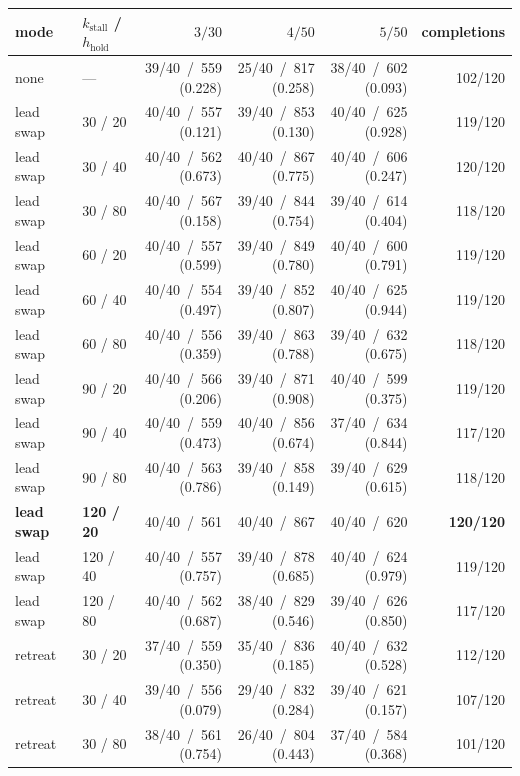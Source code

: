 \begin{tabular}{llrrrr}
\toprule
mode & $k_{\mathrm{stall}}$ / $h_{\mathrm{hold}}$ & $3/30$ & $4/50$ & $5/50$ & completions \\
\midrule
none & --- & 39/40 \,/\, 559 (0.228) & 25/40 \,/\, 817 (0.258) & 38/40 \,/\, 602 (0.093) & 102/120 \\
lead swap & 30 / 20 & 40/40 \,/\, 557 (0.121) & 39/40 \,/\, 853 (0.130) & 40/40 \,/\, 625 (0.928) & 119/120 \\
lead swap & 30 / 40 & 40/40 \,/\, 562 (0.673) & 40/40 \,/\, 867 (0.775) & 40/40 \,/\, 606 (0.247) & 120/120 \\
lead swap & 30 / 80 & 40/40 \,/\, 567 (0.158) & 39/40 \,/\, 844 (0.754) & 39/40 \,/\, 614 (0.404) & 118/120 \\
lead swap & 60 / 20 & 40/40 \,/\, 557 (0.599) & 39/40 \,/\, 849 (0.780) & 40/40 \,/\, 600 (0.791) & 119/120 \\
lead swap & 60 / 40 & 40/40 \,/\, 554 (0.497) & 39/40 \,/\, 852 (0.807) & 40/40 \,/\, 625 (0.944) & 119/120 \\
lead swap & 60 / 80 & 40/40 \,/\, 556 (0.359) & 39/40 \,/\, 863 (0.788) & 39/40 \,/\, 632 (0.675) & 118/120 \\
lead swap & 90 / 20 & 40/40 \,/\, 566 (0.206) & 39/40 \,/\, 871 (0.908) & 40/40 \,/\, 599 (0.375) & 119/120 \\
lead swap & 90 / 40 & 40/40 \,/\, 559 (0.473) & 40/40 \,/\, 856 (0.674) & 37/40 \,/\, 634 (0.844) & 117/120 \\
lead swap & 90 / 80 & 40/40 \,/\, 563 (0.786) & 39/40 \,/\, 858 (0.149) & 39/40 \,/\, 629 (0.615) & 118/120 \\
\textbf{lead swap} & \textbf{120 / 20} & 40/40 \,/\, 561 & 40/40 \,/\, 867 & 40/40 \,/\, 620 & \textbf{120/120} \\
lead swap & 120 / 40 & 40/40 \,/\, 557 (0.757) & 39/40 \,/\, 878 (0.685) & 40/40 \,/\, 624 (0.979) & 119/120 \\
lead swap & 120 / 80 & 40/40 \,/\, 562 (0.687) & 38/40 \,/\, 829 (0.546) & 39/40 \,/\, 626 (0.850) & 117/120 \\
retreat & 30 / 20 & 37/40 \,/\, 559 (0.350) & 35/40 \,/\, 836 (0.185) & 40/40 \,/\, 632 (0.528) & 112/120 \\
retreat & 30 / 40 & 39/40 \,/\, 556 (0.079) & 29/40 \,/\, 832 (0.284) & 39/40 \,/\, 621 (0.157) & 107/120 \\
retreat & 30 / 80 & 38/40 \,/\, 561 (0.754) & 26/40 \,/\, 804 (0.443) & 37/40 \,/\, 584 (0.368) & 101/120 \\

\end{tabular}

